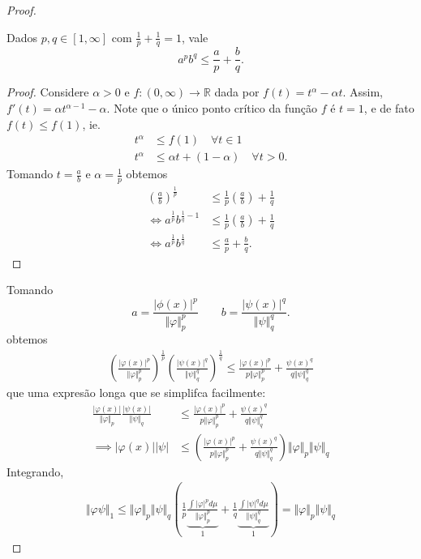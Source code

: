 \documentclass{article}
\theoremstyle{definition}
\numberwithin{equation}{section}
\newcommand{\R}{\mathbb{R}}
\begin{document}
\begin{proof}
	\begin{claim}
		Dados $p,q\in[1,\infty]$ com $\frac{1}{p}+\frac{1}{q}=1$, vale
		\[a^pb^q\leq\frac{a}{p}+\frac{b}{q}.\]
	\end{claim}
	\begin{proof}
		Considere $\alpha>0$ e $f:(0,\infty)\to\R$ dada por $f(t)=t^\alpha-\alpha t$. Assim, $f'(t)=\alpha t^{\alpha-1}-\alpha$.  Note que o único ponto crítico da função $f$ é $t=1$, e de fato $f(t)\leq f(1)$, ie.
		\begin{align*}
			t^\alpha&\leq f(1)\quad\forall t\in1\\
			t^\alpha&\leq\alpha t+(1-\alpha)\quad\forall t>0.
		\end{align*}
		Tomando $t=\frac{a}{b}$ e $\alpha=\frac{1}{p}$ obtemos
		\begin{align*}
			\left(\frac{a}{b}\right)^{\frac{1}{p}}&\leq\frac{1}{p}\left(\frac{a}{b}\right)+\frac{1}{q}\\
			\iff a^{\frac{1}{p}}b^{\frac{1}{q}-1}&\leq\frac{1}{p}\left(\frac{a}{b}\right)+\frac{1}{q}\\
			\iff a^{\frac{1}{p}}b^{\frac{1}{q}}&\leq\frac{a}{p}+\frac{b}{q}.
		\end{align*}
	\end{proof}
	Tomando 
	\[a=\frac{|\phi(x)|^p}{\Vert\varphi\Vert^p_p}\qquad b=\frac{|\psi(x)|^q}{\Vert\psi\Vert^q_q}.\]
	obtemos
	\begin{align*}
		\left(\frac{|\varphi(x)|^p}{\Vert\varphi\Vert_p^p}\right)^\frac{1}{p}\left(\frac{|\psi(x)|^q}{\Vert\psi\Vert_q^q}\right)^\frac{1}{q}\leq\frac{|\varphi(x)|^p}{p\Vert \varphi\Vert^p_p}+\frac{\psi(x)^q}{q\Vert\psi\Vert_q^q}
	\end{align*}
	que uma expresão longa que se simplifca facilmente:
	\begin{align*}
		\frac{|\varphi(x)|}{\Vert\varphi\Vert_p}\frac{|\psi(x)|}{\Vert\psi\Vert_q}&\leq \frac{|\varphi(x)|^p}{p\Vert \varphi\Vert^p_p}+\frac{\psi(x)^q}{q\Vert\psi\Vert_q^q}\\
		\implies |\varphi(x)||\psi|&\leq\left(\frac{|\varphi(x)|^p}{p\Vert \varphi\Vert^p_p}+\frac{\psi(x)^q}{q\Vert\psi\Vert_q^q}\right)\Vert\varphi\Vert_p\Vert\psi\Vert_q
	\end{align*}
	Integrando,
	\begin{align*}
		\Vert\varphi\psi\Vert_1\leq\Vert\varphi\Vert_p\Vert\psi\Vert_q\left(\frac{1}{p}\underbrace{\frac{\int|\varphi|^pd\mu}{\Vert\varphi\Vert^p_p}}_1+\frac{1}{q}\underbrace{\frac{\int|\psi|^qd\mu}{\Vert\psi\Vert_q^q}}_1\right)=\Vert\varphi\Vert_p\Vert\psi\Vert_q
	\end{align*}
\end{proof}
\end{document}
